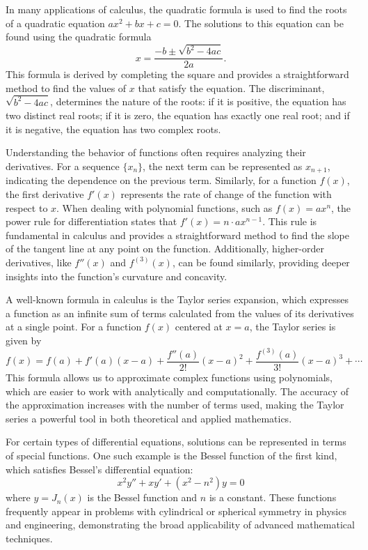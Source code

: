 \documentclass{article}
\begin{document}
In many applications of calculus, 
the quadratic formula is used to find 
the roots of a quadratic equation 
$ ax^2 + bx + c = 0 $. 
The solutions to this equation can be found 
using the quadratic formula 
\[ x = \frac{-b \pm \sqrt{b^2 - 4ac}}{2a}.\] 
This formula is derived by completing 
the square and provides a straightforward method to 
find the values of $ x $ that satisfy the equation. 
The discriminant, $ \sqrt{b^2 - 4ac} $, 
determines the nature of the roots: 
if it is positive, 
the equation has two distinct real roots; 
if it is zero, the equation has exactly one real root; 
and if it is negative, the equation has two complex roots.

Understanding the behavior of functions often 
requires analyzing their derivatives. 
For a sequence $\{x_n\}$, 
the next term can be represented as $x_{n+1}$, indicating the dependence on the previous term. 
Similarly, for a function $f(x)$, 
the first derivative $f'(x)$ represents 
the rate of change of 
the function with respect to $x$. 
When dealing with polynomial functions, 
such as $f(x) = ax^n$, the power rule for 
differentiation states that $f'(x) = n \cdot ax^{n-1}$. 
This rule is fundamental in calculus and provides a straightforward method to find the slope of 
the tangent line at any point on the function. 
Additionally, higher-order derivatives, 
like $f''(x)$ and $f^{(3)}(x)$, can be found similarly, 
providing deeper insights into 
the function's curvature and concavity.

A well-known formula in calculus is 
the Taylor series expansion, 
which expresses a function as 
an infinite sum of terms calculated from 
the values of its derivatives at a single point. 
For a function $f(x)$ centered at $x = a$, 
the Taylor series is given by
\begin{equation}
f(x) = f(a) + f'(a)(x - a) + \frac{f''(a)}{2!}(x - a)^2 + \frac{f^{(3)}(a)}{3!}(x - a)^3 + \cdots
\end{equation}
This formula allows us to approximate 
complex functions using polynomials, 
which are easier to work with 
analytically and computationally. 
The accuracy of the approximation increases with 
the number of terms used, 
making the Taylor series a powerful tool in 
both theoretical and applied mathematics.

For certain types of differential equations, 
solutions can be represented in 
terms of special functions. 
One such example is the Bessel function of 
the first kind, 
which satisfies Bessel's differential equation:
\begin{equation}
x^2 y'' + x y' + (x^2 - n^2) y = 0
\end{equation}
where $ y = J_n(x) $ is the Bessel function and 
$ n $ is a constant. 
These functions frequently appear in 
problems with cylindrical or 
spherical symmetry in physics and engineering, 
demonstrating the broad applicability of 
advanced mathematical techniques.
\end{document}
